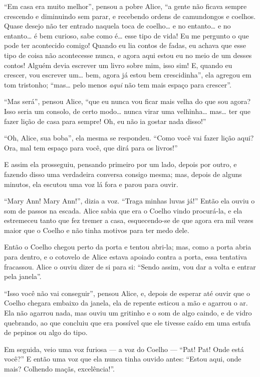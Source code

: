 ``Em casa era muito melhor'', pensou a pobre Alice, ``a gente não ficava
sempre crescendo e diminuindo sem parar, e recebendo ordens de
camundongos e coelhos. Quase desejo não ter entrado naquela toca de
coelho\ldots{} e no entanto\ldots{} e no entanto\ldots{} é bem curioso, sabe como é\ldots{}
esse tipo de vida! Eu me pergunto o que pode ter acontecido comigo!
Quando eu lia contos de fadas, eu achava que esse tipo de coisa não
acontecesse nunca, e agora aqui estou eu no meio de um desses contos!
Alguém devia escrever um livro sobre mim, isso sim! E, quando eu crescer,
vou escrever um\ldots{} bem, agora já estou bem crescidinha'', ela agregou em
tom tristonho; ``mas\ldots{} pelo menos \emph{aqui} não tem mais espaço para
crescer''.

``Mas será'', pensou Alice, ``que eu nunca vou ficar mais velha do que
sou agora? Isso seria um consolo, de certo modo\ldots{} nunca virar uma
velhinha\ldots{} mas\ldots{} ter que fazer lição de casa para sempre! Oh, eu não
ia gostar nada disso!''

``Oh, Alice, sua boba'', ela mesma se respondeu. ``Como você vai fazer
lição aqui? Ora, mal tem espaço para você, que dirá para os livros!''

E assim ela prosseguiu, pensando primeiro por um lado, depois por outro,
e fazendo disso uma verdadeira conversa consigo mesma; mas, depois de
alguns minutos, ela escutou uma voz lá fora e parou para ouvir.

``Mary Ann! Mary Ann!'', dizia a voz. ``Traga minhas luvas já!'' Então
ela ouviu o som de passos na escada. Alice sabia que era o Coelho vindo
procurá-la, e ela estremeceu tanto que fez tremer a casa, esquecendo-se
de que agora era mil vezes maior que o Coelho e não tinha motivos para
ter medo dele.

Então o Coelho chegou perto da porta e tentou abri-la; mas, como a
porta abria para dentro, e o cotovelo de Alice estava apoiado contra a
porta, essa tentativa fracassou. Alice o ouviu dizer de si para si:
``Sendo assim, vou dar a volta e entrar pela janela''.

``Isso você não vai conseguir'', pensou Alice, e, depois de esperar até
ouvir que o Coelho chegara embaixo da janela, ela de repente esticou a
mão e agarrou o ar. Ela não agarrou nada, mas ouviu um gritinho e o som
de algo caindo, e de vidro quebrando, ao que concluiu que era possível
que ele tivesse caído em uma estufa de pepinos ou algo do tipo.

Em seguida, veio uma voz furiosa --- a voz do Coelho --- ``Pat! Pat! Onde
está você?'' E então uma voz que ela nunca tinha ouvido antes: ``Estou
aqui, onde mais? Colhendo maçãs, excelência!''.

